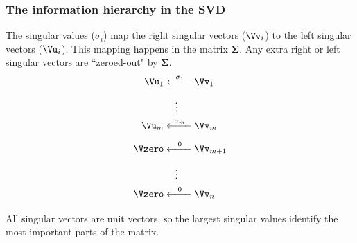 \documentclass{beamer}
\renewcommand\VSigma{\ensuremath{\boldsymbol{\Sigma}}}
\begin{document}
\begin{frame}
\frametitle{The information hierarchy in the SVD}

The singular values ($\sigma_i$) map the right singular vectors ($\Vv_i$) to the left singular vectors ($\Vu_i$). This mapping happens in the matrix \VSigma. Any extra right or left singular vectors are ``zeroed-out" by \VSigma. 
\begin{align*}
	\Vu_1 &\xleftarrow[\phantom{\sigma_{m+1}}]{\sigma_1} \Vv_1 \\	
		&\quad\,\vdots \\
	\Vu_m &\xleftarrow[\phantom{\sigma_{m+1}}]{\sigma_m} \Vv_m \\	
	\Vzero &\xleftarrow[\phantom{\sigma_{m+1}}]{0} \Vv_{m+1} \\	
		&\quad\,\vdots \\
	\Vzero &\xleftarrow[\phantom{\sigma_{m+1}}]{0} \Vv_n 
\end{align*}
\pause
All singular vectors are unit vectors, so the largest singular values identify the most important parts of the matrix.

\end{frame}
\end{document}
